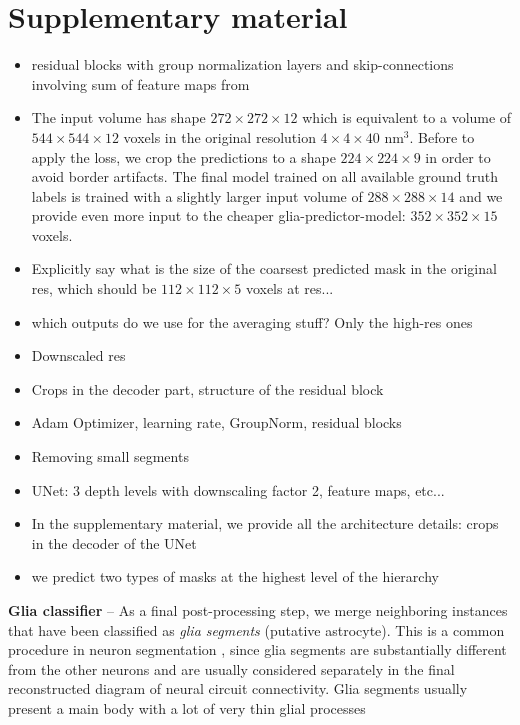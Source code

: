
\section{Supplementary material}
\begin{itemize}
\item residual blocks with group normalization layers and skip-connections involving sum of feature maps from 
\item The input volume has shape $272 \times 272\times12$ which is equivalent to a volume of $544\times 544\times 12$ voxels in the original resolution $4\times 4\times 40$ nm$^3$. Before to apply the loss, we crop the predictions to a shape $224\times 224\times 9$ in order to avoid border artifacts. 
The final model trained on all available ground truth labels is trained with a slightly larger input volume of $288\times 288\times 14$ and we provide even more input to the cheaper glia-predictor-model: $352\times 352\times 15$ voxels. 
\item Explicitly say what is the size of the coarsest predicted mask in the original res, which should be $112 \times 112 \times 5$ voxels at res...
\item which outputs do we use for the averaging stuff? Only the high-res ones
\item Downscaled res
\item Crops in the decoder part, structure of the residual block
\item Adam Optimizer, learning rate, GroupNorm, residual blocks
\item Removing small segments
\item UNet: 3 depth levels with downscaling factor 2, feature maps, etc...
\item In the supplementary material, we provide all the architecture details: crops in the decoder of the UNet
\item we predict two types of \maskname masks at the highest level of the hierarchy
\end{itemize}

\textbf{Glia classifier} -- As a final post-processing step, we merge neighboring instances that have been classified as \emph{glia segments} (putative astrocyte). This is a common procedure in neuron segmentation \cite{lee2019learning}, since glia segments are substantially different from the other neurons and are usually considered separately in the final reconstructed diagram of neural circuit connectivity. Glia segments usually present a main body with a lot of very thin glial processes


